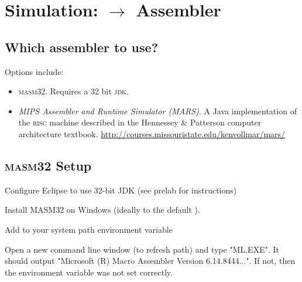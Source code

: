 \chapter{Simulation: \F $\rightarrow$ Assembler}

\section{Which assembler to use?}

Options include:

\begin{itemize}

    \item \textsc{masm32}. Requires a 32 bit \textsc{jdk}.

    \item \emph{MIPS Assembler and Runtime Simulator (MARS)}. A Java
    implementation of the \textsc{risc} machine described in the
    Hennessey \& Patterson computer architecture textbook.
    \url{http://courses.missouristate.edu/kenvollmar/mars/}

\end{itemize}

\section{\textsc{masm32} Setup}

\biTight

\item Configure Eclipse to use 32-bit JDK (see prelab for instructions)

\item Install MASM32 on Windows (ideally to the default ).

\item Add  to your system path environment variable

\item Open a new command line window (to refresh path) and type "ML.EXE". It should output "Microsoft (R) Macro Assembler Version 6.14.8444...". If not, then the environment variable was not set correctly.

\ei

